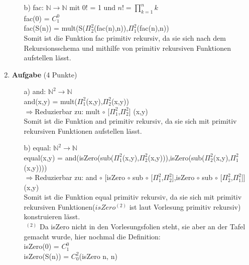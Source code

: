 \documentclass[11pt]{article}
\newcommand{\punkte}[1]{{\small{ }(#1 Punkte)}}
\newcommand{\aufgabe}[1]{\item{\bf #1}}
\begin{document}
\begin{enumerate}
\begin{enumerate}
\item[b)]fac: $\mathbb{N} \rightarrow \mathbb{N}$ mit 0! = 1 und $n! = \displaystyle \prod_{k=1}^n k$\\
fac(0) = $C_1^0$\\
fac(S(n)) = mult(S($\Pi_2^2$(fac(n),n)),$\Pi_1^2$(fac(n),n))\\
\newline
Somit ist die Funktion fac primitiv rekursiv, da sie sich nach dem Rekursionsschema und mithilfe von primitiv rekursiven Funktionen aufstellen lässt.
\end{enumerate}
\newpage

\aufgabe{Aufgabe}\punkte{4}
\begin{itemize}
\item[a)]and: $\mathbb{N}^2 \rightarrow \mathbb{N}$\\
\newline
and(x,y) = mult($\Pi_1^2$(x,y),$\Pi_2^2$(x,y))\\
\newline
$\Rightarrow$Reduzierbar zu: mult $\circ$ [$\Pi_1^2$,$\Pi_2^2$] (x,y)\\
Somit ist die Funktion and primitiv rekursiv, da sie sich mit primitiv rekursiven Funktionen aufstellen lässt.\\

\item[b)]equal: $\mathbb{N}^2 \rightarrow \mathbb{N}$\\
\newline
equal(x,y) = and(isZero(sub($\Pi_1^2$(x,y),$\Pi_2^2$(x,y))),isZero(sub($\Pi_2^2$(x,y),$\Pi_1^2$(x,y))))\\
\newline
$\Rightarrow$Reduzierbar zu: and $\circ$ [isZero $\circ$ sub $\circ$ [$\Pi_1^2$,$\Pi_2^2$],isZero $\circ$ sub $\circ$ [$\Pi_2^2$,$\Pi_1^2$]](x,y)\\
Somit ist die Funktion equal primitiv rekursiv, da sie sich mit primitiv rekursiven Funktionen($isZero^{(2)}$ ist laut Vorlesung primitiv rekursiv) konstruieren lässt.\\
\newline
\newline
$\phantom{.}^{(2)}$ Da isZero nicht in den Vorlesungsfolien steht, sie aber an der Tafel gemacht wurde, hier nochmal die Definition:\\
\newline
isZero(0) = $C_1^0$\\
isZero(S(n)) = $C_0^2$(isZero n, n)\\
\end{itemize}


\end{enumerate}
\end{document}
